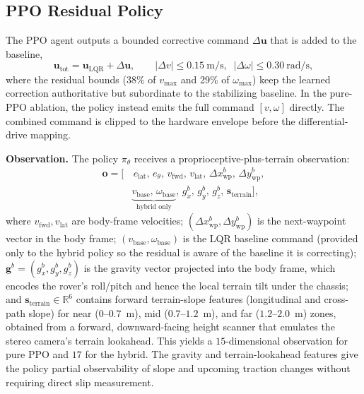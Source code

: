 \documentclass[conference]{IEEEtran}
\begin{document}
\subsection{PPO Residual Policy}
The PPO agent outputs a bounded corrective command $\Delta\mathbf{u}$ that is added to the baseline,
\begin{equation}
\mathbf{u}_{\text{tot}} = \mathbf{u}_{\text{LQR}} + \Delta\mathbf{u}, \qquad
|\Delta v| \le 0.15~\text{m/s},\;\; |\Delta\omega| \le 0.30~\text{rad/s},
\end{equation}
where the residual bounds (38\% of $v_{\max}$ and 29\% of $\omega_{\max}$) keep the learned correction authoritative but subordinate to the stabilizing baseline. In the pure-PPO ablation, the policy instead emits the full command $[v,\omega]$ directly. The combined command is clipped to the hardware envelope before the differential-drive mapping.

\noindent\textbf{Observation.} The policy $\pi_\theta$ receives a proprioceptive-plus-terrain observation:
\begin{align}
\mathbf{o} = \big[ &\, e_{\text{lat}},\, e_{\theta},\, v_{\text{fwd}},\, v_{\text{lat}},\, \Delta x^{b}_{\text{wp}},\, \Delta y^{b}_{\text{wp}}, \nonumber\\
& \underbrace{v_{\text{base}},\, \omega_{\text{base}}}_{\text{hybrid only}},\, g^{b}_{x},\, g^{b}_{y},\, g^{b}_{z},\, \mathbf{s}_{\text{terrain}} \big],
\end{align}
where $v_{\text{fwd}}, v_{\text{lat}}$ are body-frame velocities; $(\Delta x^{b}_{\text{wp}}, \Delta y^{b}_{\text{wp}})$ is the next-waypoint vector in the body frame; $(v_{\text{base}},\omega_{\text{base}})$ is the LQR baseline command (provided only to the hybrid policy so the residual is aware of the baseline it is correcting); $\mathbf{g}^{b}=(g^{b}_x,g^{b}_y,g^{b}_z)$ is the gravity vector projected into the body frame, which encodes the rover's roll/pitch and hence the local terrain tilt under the chassis; and $\mathbf{s}_{\text{terrain}}\in\mathbb{R}^{6}$ contains forward terrain-slope features (longitudinal and cross-path slope) for near ($0$--$0.7$~m), mid ($0.7$--$1.2$~m), and far ($1.2$--$2.0$~m) zones, obtained from a forward, downward-facing height scanner that emulates the stereo camera's terrain lookahead. This yields a $15$-dimensional observation for pure PPO and $17$ for the hybrid. The gravity and terrain-lookahead features give the policy partial observability of slope and upcoming traction changes without requiring direct slip measurement.
\end{document}
